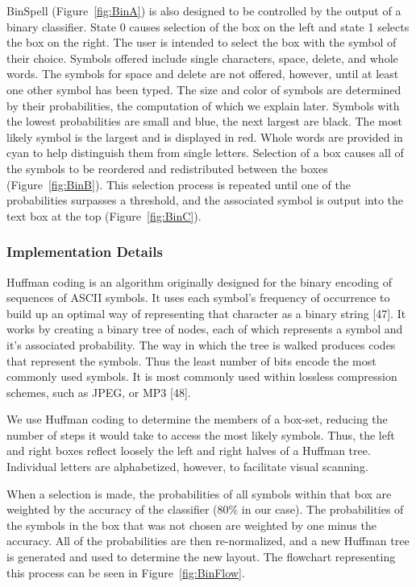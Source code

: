 \documentclass[12pt,titlepage]{article}
\begin{document}
BinSpell (Figure~\ref{fig:BinA}) is also designed to be controlled by the output of a binary classifier.  State 0 causes 
selection of the box on the left and state 1 selects the box on the right.  The user is intended to select the 
box with the symbol of their choice.  Symbols offered include single characters, space, delete, and 
whole words.  The symbols for space and delete are not offered, however, until at least one other 
symbol has been typed.  The size and color of symbols are determined by their probabilities, the 
computation of which we explain later.  Symbols with the lowest probabilities are small and blue, the 
next largest are black.  The most likely symbol is the largest and is displayed in red.  Whole words are 
provided in cyan to help distinguish them from single letters.  Selection of a box causes all of the 
symbols to be reordered and redistributed between the boxes (Figure~\ref{fig:BinB}).  This selection process is repeated 
until one of the probabilities surpasses a threshold, and the associated symbol is output into the text box 
at the top (Figure~\ref{fig:BinC}). 

\subsubsection{Implementation Details}

Huffman coding is an algorithm originally designed for the binary encoding of sequences of ASCII 
symbols.  It uses each symbol's frequency of occurrence to build up an optimal way of representing that 
character as a binary string [47].  It works by creating a binary tree of nodes, each of which represents a 
symbol and it's associated probability. The way in which the tree is walked produces codes that 
represent the symbols.  Thus the least number of bits encode the most commonly used symbols.  It is 
most commonly used within lossless compression schemes, such as JPEG, or MP3 [48].

We use Huffman coding to determine the members of a box-set,  reducing the number of steps it would 
take to access the most likely symbols.  Thus, the left and right boxes reflect loosely the left and right 
halves of a Huffman tree.  Individual letters are alphabetized, however, to facilitate visual scanning.

When a selection is made, the probabilities of all symbols within that box are weighted by the accuracy 
of the classifier (80\% in our case).  The probabilities of the symbols in the box that was not chosen are 
weighted by one minus the accuracy.  All of the probabilities are then re-normalized, and a new 
Huffman tree is generated and used to determine the new layout.  The flowchart representing this 
process can be seen in Figure~\ref{fig:BinFlow}.
\end{document}
